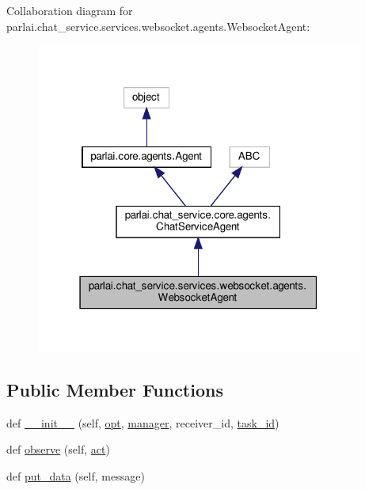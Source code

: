 Collaboration diagram for parlai.\+chat\+\_\+service.\+services.\+websocket.\+agents.\+Websocket\+Agent\+:
\nopagebreak
\begin{figure}[H]
\begin{center}
\leavevmode
\includegraphics[width=304pt]{d0/d15/classparlai_1_1chat__service_1_1services_1_1websocket_1_1agents_1_1WebsocketAgent__coll__graph}
\end{center}
\end{figure}
\subsection*{Public Member Functions}
\begin{DoxyCompactItemize}
\item 
def \hyperlink{classparlai_1_1chat__service_1_1services_1_1websocket_1_1agents_1_1WebsocketAgent_a128d5ee9aaa2861274d95778b75dda16}{\+\_\+\+\_\+init\+\_\+\+\_\+} (self, \hyperlink{classparlai_1_1core_1_1agents_1_1Agent_ab3b45d2754244608c75d4068b90cd051}{opt}, \hyperlink{classparlai_1_1chat__service_1_1core_1_1agents_1_1ChatServiceAgent_a8216a688db46e2aa7cdd023016ecf27c}{manager}, receiver\+\_\+id, \hyperlink{classparlai_1_1chat__service_1_1core_1_1agents_1_1ChatServiceAgent_a1f1f978765ae81ca5ec8d04d14575386}{task\+\_\+id})
\item 
def \hyperlink{classparlai_1_1chat__service_1_1services_1_1websocket_1_1agents_1_1WebsocketAgent_aae41aaeb0af93fb30a11e731167c596c}{observe} (self, \hyperlink{classparlai_1_1chat__service_1_1core_1_1agents_1_1ChatServiceAgent_afbb942bd61c840d55354e5cfea6a1f4d}{act})
\item 
def \hyperlink{classparlai_1_1chat__service_1_1services_1_1websocket_1_1agents_1_1WebsocketAgent_a8e6bb97a0b0996be55dd7aacedc62dff}{put\+\_\+data} (self, message)
\end{DoxyCompactItemize}
